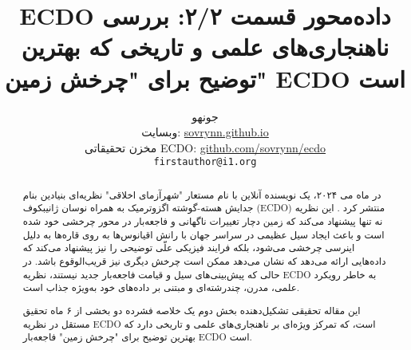 \documentclass[10pt,twocolumn,letterpaper]{article}
\begin{document}
\title{ECDO داده‌محور قسمت ۲/۲: بررسی ناهنجاری‌های علمی و تاریخی که بهترین توضیح برای "چرخش زمین" ECDO است}

\author{جونهو\\
وبسایت: \href{https://sovrynn.github.io}{sovrynn.github.io}\\
مخزن تحقیقاتی ECDO: \href{https://github.com/sovrynn/ecdo}{github.com/sovrynn/ecdo}\\
{\tt\small firstauthor@i1.org}
}

\maketitle

\begin{abstract}
در ماه می ۲۰۲۴، یک نویسنده آنلاین با نام مستعار "شهرآزمای اخلاقی" \cite{0} نظریه‌ای بنیادین بنام جدایش هسته-گوشته اگزوترمیک به همراه نوسان ژانیبکوف (ECDO) منتشر کرد \cite{1}. این نظریه نه تنها پیشنهاد می‌کند که زمین دچار تغییرات ناگهانی و فاجعه‌بار در محور چرخشی خود شده است و باعث ایجاد سیل عظیمی در سراسر جهان با رانش اقیانوس‌ها به روی قاره‌ها به دلیل اینرسی چرخشی می‌شود، بلکه فرایند فیزیکی علّی توضیحی را نیز پیشنهاد می‌کند که داده‌هایی ارائه می‌دهد که نشان می‌دهد ممکن است چرخش دیگری نیز قریب‌الوقوع باشد. در حالی که پیش‌بینی‌های سیل و قیامت فاجعه‌بار جدید نیستند، نظریه ECDO به خاطر رویکرد علمی، مدرن، چند‌رشته‌ای و مبتنی بر داده‌های خود به‌ویژه جذاب است.

این مقاله تحقیقی تشکیل‌دهنده بخش دوم یک خلاصه فشرده دو بخشی از ۶ ماه تحقیق مستقل \cite{2,20} در نظریه ECDO است، که تمرکز ویژه‌ای بر ناهنجاری‌های علمی و تاریخی دارد که بهترین توضیح برای "چرخش زمین" فاجعه‌بار ECDO است.

\end{abstract}

{\small


}
\end{document}

